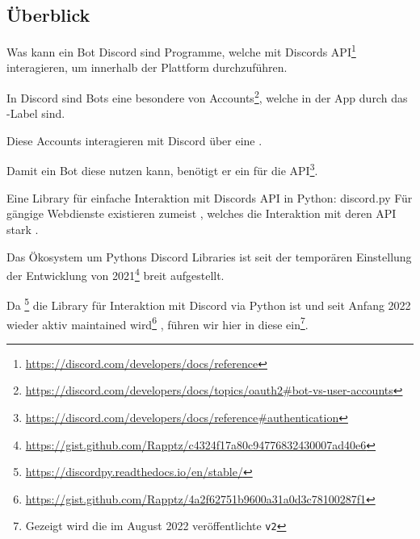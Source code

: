 \documentclass[12pt, aspectratio=169, usepdftitle=false]{beamer}
\newcommand{\pp}[1]{\lpl{#1}}
\newcommand{\furl}[1]{\footnote{\url{#1}}}
\begin{document}
\framecardfragen

\subsection{Überblick}

\begin{frame}{Was kann ein Bot}
	Discord  sind Programme, welche mit Discords API\furl{https://discord.com/developers/docs/reference} interagieren, um  innerhalb der Plattform durchzuführen.
	
	\medskip
	
	In Discord sind Bots eine besondere  von Accounts\furl{https://discord.com/developers/docs/topics/oauth2\#bot-vs-user-accounts}, welche in der App durch das \pp{BOT}-Label  sind.
	
	\medskip
	
	Diese Accounts interagieren mit Discord über eine .
	
	\medskip
	
	Damit ein Bot diese nutzen kann, benötigt er ein  für die API\furl{https://discord.com/developers/docs/reference\#authentication}.
	
\end{frame}

\begin{frame}{Eine Library für einfache Interaktion mit Discords API in Python: discord.py}
	Für gängige Webdienste existieren zumeist , welches die Interaktion mit\newline
	deren API stark .
	
	\medskip
	
	Das Ökosystem um Pythons Discord Libraries ist seit der temporären Einstellung der Entwicklung von \pp{discord.py} 2021\furl{https://gist.github.com/Rapptz/c4324f17a80c94776832430007ad40e6} 
	breit aufgestellt.
	
	\medskip
	
	Da \pp{discord.py}\furl{https://discordpy.readthedocs.io/en/stable/}
	die  Library für Interaktion mit Discord via Python ist und seit Anfang 2022 wieder aktiv maintained wird\furl{https://gist.github.com/Rapptz/4a2f62751b9600a31a0d3c78100287f1}
	, führen wir hier in diese ein\footnote{Gezeigt wird die im August 2022 veröffentlichte \texttt{v2}}.
	
\end{frame}

\framecardfragen
\end{document}
